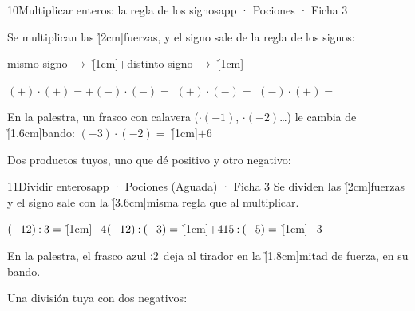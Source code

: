 \documentclass[12pt]{article}
\begin{document}
\begin{cromo}{10}{Multiplicar enteros: la regla de los signos}{app · Pociones · Ficha 3}
\begin{minipage}[c]{.7\linewidth}\raggedright
\completa Se multiplican las \h[2cm]{fuerzas}, y el signo sale de la regla de los signos:\par\vspace{1mm}
\hspace*{4mm}mismo signo $\rightarrow$ \h[1cm]{$+$}\qquad distinto signo $\rightarrow$ \h[1cm]{$-$}\par\vspace{1mm}
\hspace*{4mm}$(+)\cdot(+) = +$\quad $(-)\cdot(-) =$ \hc{+}\quad $(+)\cdot(-) =$ \quad $(-)\cdot(+) =$ \par\vspace{2mm}
En la palestra, un frasco con calavera ($\cdot(-1)$, $\cdot(-2)$…) le cambia de \h[1.6cm]{bando}: $(-3)\cdot(-2) =$ \h[1cm]{$+6$}
\end{minipage}%
\begin{minipage}[c]{.3\linewidth}\centering{}\end{minipage}

\vspace{2mm}
\tuejemplo Dos productos tuyos, uno que dé positivo y otro negativo:
\end{cromo}

\begin{cromo}{11}{Dividir enteros}{app · Pociones (Aguada) · Ficha 3}
\completa Se dividen las \h[2cm]{fuerzas} y el signo sale con la \h[3.6cm]{misma regla} que al multiplicar.\par\vspace{2mm}
$(-12)\mathbin{:} 3 =$ \h[1cm]{$-4$}\qquad $(-12)\mathbin{:}(-3) =$ \h[1cm]{$+4$}\qquad $15\mathbin{:}(-5) =$ \h[1cm]{$-3$}\par\vspace{2mm}
En la palestra, el frasco azul $\mathbin{:} 2$ deja al tirador en la \h[1.8cm]{mitad} de fuerza, en su bando.

\vspace{2mm}
\tuejemplo Una división tuya con dos negativos:
\end{cromo}
\end{document}
